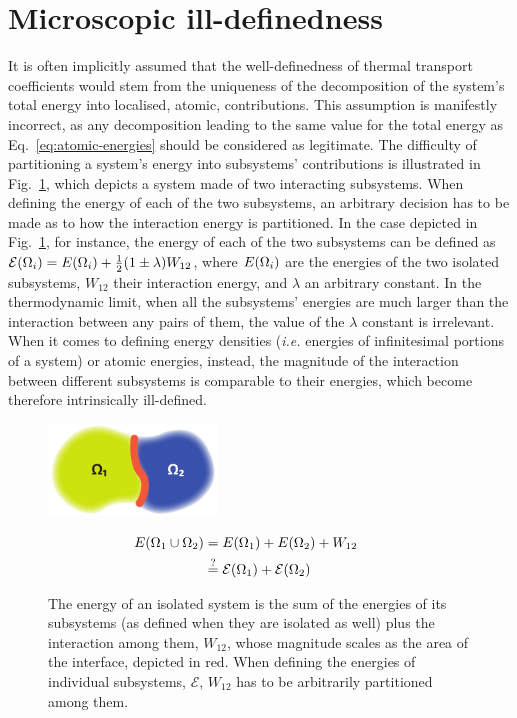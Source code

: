 \section{Microscopic ill-definedness} \label{sec:micro-illdef}

It is often implicitly assumed that the well-definedness of thermal transport coefficients would stem from the uniqueness of the decomposition of the system's total energy into localised, atomic, contributions. This assumption is manifestly incorrect, as any decomposition leading to the same value for the total energy as Eq.~\eqref{eq:atomic-energies} should be considered as legitimate. The difficulty of partitioning a system's energy into subsystems' contributions is illustrated in Fig.~\ref{fig:energy-partition}, which depicts a system made of two interacting subsystems. When defining the energy of each of the two subsystems, an arbitrary decision has to be made as to how the interaction energy is partitioned. In the case depicted in Fig.~\ref{fig:energy-partition}, for instance, the energy of each of the two subsystems can be defined as $\mathcal{E}({\mathrm\Omega}_i) = E({\mathrm\Omega}_i) + \frac{1}{2}(1\pm\lambda)W_{12}$, where $E({\mathrm\Omega}_i)$ are the energies of the two isolated subsystems, $W_{12}$ their interaction energy, and $\lambda$ an arbitrary constant. In the thermodynamic limit, when all the subsystems' energies are much larger than the interaction between any pairs of them, the value of the $\lambda$ constant is irrelevant. When it comes to defining energy densities (\emph{i.e.} energies of infinitesimal portions of a system) or atomic energies, instead, the magnitude of the interaction between different subsystems is comparable to their energies, which become therefore intrinsically ill-defined.

\begin{figure}[t]
    \begin{minipage}{0.45\textwidth}
        \centering \includegraphics[width=4.5cm]{chapters/chapter3/figures/blob.jpg}
    \end{minipage}
    \begin{minipage}{0.45\textwidth}
        \begin{align*}
        E({\mathrm\Omega}_{1}\cup{\mathrm\Omega}_2) &= E({\mathrm\Omega}_1) + E({\mathrm\Omega}_2) + W_{12} \qquad \\
        & \overset{?}{=}\mathcal{E}({\mathrm\Omega}_1)+\mathcal{E}({\mathrm\Omega}_2)
        \end{align*}
    \end{minipage}
\caption{
	The energy of an isolated system is the sum of the energies of its subsystems (as defined when they are isolated as well) plus the interaction among them, $W_{12}$, whose magnitude scales as the area of the interface, depicted in red. When defining the energies of individual subsystems, $\mathcal{E}$, $W_{12}$ has to be arbitrarily partitioned among them.
	}
	\label{fig:energy-partition}
\end{figure}

